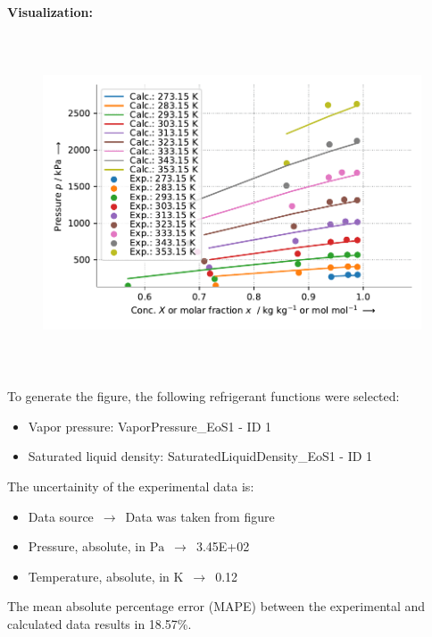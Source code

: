 \textbf{Visualization:}
%
\begin{figure}[!htp]
{\noindent\includegraphics[height=10cm, keepaspectratio]{figs/abs/abs_R-134a_lubricant_PAG_NrtlFixedDg_1.pdf}}
\end{figure}
%

To generate the figure, the following refrigerant functions were selected:
\begin{itemize}
\item Vapor pressure: VaporPressure\_EoS1 - ID 1
\item Saturated liquid density: SaturatedLiquidDensity\_EoS1 - ID 1
\end{itemize}

The uncertainity of the experimental data is:
\begin{itemize}
\item Data source $\,\to\,$ Data was taken from figure
\item Pressure, absolute, in $\si{\pascal}$ $\,\to\,$ 3.45E+02
\item Temperature, absolute, in $\si{\kelvin}$ $\,\to\,$ 0.12
\end{itemize}

The mean absolute percentage error (MAPE) between the experimental and calculated data results in 18.57\%.
\FloatBarrier
\newpage
